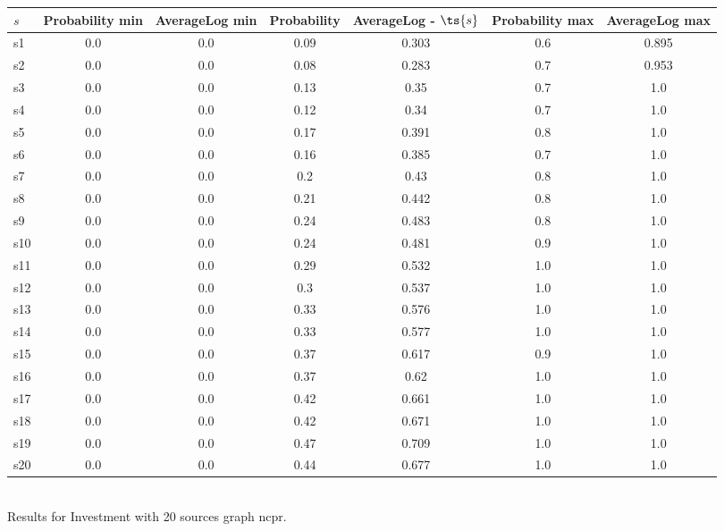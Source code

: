 \documentclass{article}
\begin{document}
\noindent\begin{tabular}{|l|c|c|c|c|c|c|}
\hline
$s$& Probability min & AverageLog min & Probability & AverageLog - $\ts{s}$ & Probability max & AverageLog max\\
\hline
s1 &0.0 & 0.0 & 0.09 & 0.303 & 0.6 & 0.895\\
\hline
s2 &0.0 & 0.0 & 0.08 & 0.283 & 0.7 & 0.953\\
\hline
s3 &0.0 & 0.0 & 0.13 & 0.35 & 0.7 & 1.0\\
\hline
s4 &0.0 & 0.0 & 0.12 & 0.34 & 0.7 & 1.0\\
\hline
s5 &0.0 & 0.0 & 0.17 & 0.391 & 0.8 & 1.0\\
\hline
s6 &0.0 & 0.0 & 0.16 & 0.385 & 0.7 & 1.0\\
\hline
s7 &0.0 & 0.0 & 0.2 & 0.43 & 0.8 & 1.0\\
\hline
s8 &0.0 & 0.0 & 0.21 & 0.442 & 0.8 & 1.0\\
\hline
s9 &0.0 & 0.0 & 0.24 & 0.483 & 0.8 & 1.0\\
\hline
s10 &0.0 & 0.0 & 0.24 & 0.481 & 0.9 & 1.0\\
\hline
s11 &0.0 & 0.0 & 0.29 & 0.532 & 1.0 & 1.0\\
\hline
s12 &0.0 & 0.0 & 0.3 & 0.537 & 1.0 & 1.0\\
\hline
s13 &0.0 & 0.0 & 0.33 & 0.576 & 1.0 & 1.0\\
\hline
s14 &0.0 & 0.0 & 0.33 & 0.577 & 1.0 & 1.0\\
\hline
s15 &0.0 & 0.0 & 0.37 & 0.617 & 0.9 & 1.0\\
\hline
s16 &0.0 & 0.0 & 0.37 & 0.62 & 1.0 & 1.0\\
\hline
s17 &0.0 & 0.0 & 0.42 & 0.661 & 1.0 & 1.0\\
\hline
s18 &0.0 & 0.0 & 0.42 & 0.671 & 1.0 & 1.0\\
\hline
s19 &0.0 & 0.0 & 0.47 & 0.709 & 1.0 & 1.0\\
\hline
s20 &0.0 & 0.0 & 0.44 & 0.677 & 1.0 & 1.0\\
\hline
\end{tabular}\\

\noindent Results for Investment with 20 sources graph ncpr.
\end{document}
